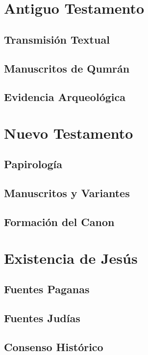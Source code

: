 \documentclass[12pt]{report}
\begin{document}
	
	
	\section{Antiguo Testamento}
	\subsection{Transmisión Textual}
	\subsection{Manuscritos de Qumrán}
	\subsection{Evidencia Arqueológica}
	
	\section{Nuevo Testamento}
	\subsection{Papirología}
	\subsection{Manuscritos y Variantes}
	\subsection{Formación del Canon}
	
	\section{Existencia de Jesús}
	\subsection{Fuentes Paganas}
	\subsection{Fuentes Judías}
	\subsection{Consenso Histórico}

	
\end{document}
